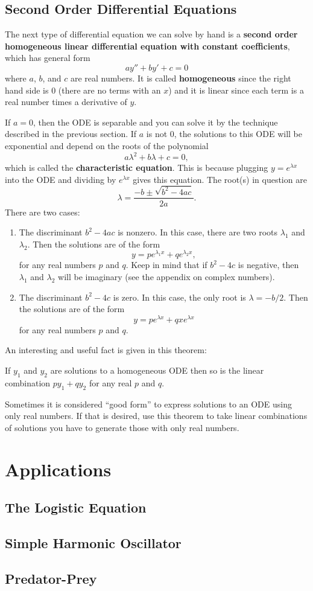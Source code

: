 \subsection{Second Order Differential Equations}

The next type of differential equation we can solve by hand is a \textbf{second order homogeneous linear differential equation with constant coefficients}, which has general form
$$ay''+by'+c=0$$
where $a$, $b$, and $c$ are real numbers. It is called \textbf{homogeneous} since the right hand side is 0 (there are no terms with an $x$) and it is linear since each term is a real number times a derivative of $y$. 

If $a=0$, then the ODE is separable and you can solve it by the technique described in the previous section. If $a$ is not 0, the solutions to this ODE will be exponential and depend on the roots of the polynomial
$$a\lambda^2 + b\lambda + c = 0,$$
which is called the \textbf{characteristic equation}.
This is because plugging $y=e^{\lambda x}$ into the ODE and dividing by $e^{\lambda x}$ gives this equation.  The root(s) in question are
$$\lambda = \frac{-b \pm \sqrt{b^2-4ac}}{2a}.$$
 There are two cases:
\begin{enumerate}
\item The discriminant $b^2-4ac$ is nonzero. In this case, there are two roots $\lambda_1$ and $\lambda_2$. Then the solutions are of the form
$$y=pe^{\lambda_1 x} + qe^{\lambda_2 x},$$
for any real numbers $p$ and $q$. Keep in mind that if $b^2-4c$ is negative, then $\lambda_1$ and $\lambda_2$ will be imaginary (see the appendix on complex numbers). 
\item The discriminant $b^2-4c$ is zero. In this case, the only root is $\lambda = -b/2$. Then the solutions are of the form
$$y=pe^{\lambda x}+qxe^{\lambda x}$$
for any real numbers $p$ and $q$.
\end{enumerate}

An interesting and useful fact is given in this theorem:
\begin{thm}
If $y_1$ and $y_2$ are solutions to a homogeneous ODE then so is the linear combination $p{y_1}+q{y_2}$ for any real $p$ and $q$.
\end{thm}
 
Sometimes it is considered ``good form'' to express solutions to an ODE using only real numbers. If that is desired, use this theorem to take linear combinations of solutions you have to generate those with only real numbers.

\section{Applications}
\subsection{The Logistic Equation}
\subsection{Simple Harmonic Oscillator}
\subsection{Predator-Prey}
